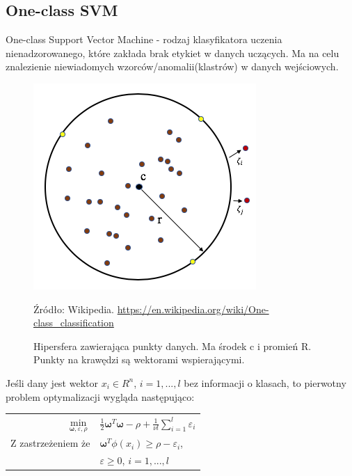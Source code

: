 \documentclass[paper=a4, fontsize=11pt]{scrartcl} %
\numberwithin{equation}{section} %
\numberwithin{figure}{section} %
\newcommand*{\captionsource}[2]{%
  \caption[{#1}]{%
      #1}
    Źródło: #2%
}
\begin{document}
\subsection{One-class SVM}
    \par One-class Support Vector Machine - rodzaj klasyfikatora uczenia
    nienadzorowanego, które zakłada brak etykiet w danych uczących. Ma na celu
    znalezienie niewiadomych wzorców/anomalii(klastrów) w danych wejściowych.  

    \begin{figure}[H]
        \begin{center}
            \includegraphics[scale=0.4]{./img/one-class-circle.png}
            \captionsource{Hipersfera zawierająca punkty danych. Ma środek c i promień R.
            Punkty na krawędzi są wektorami wspierającymi.}{Wikipedia. \url{https://en.wikipedia.org/wiki/One-class_classification}}
            \label{fig:one_class}
        \end{center}
    \end{figure}

    \par Jeśli dany jest wektor $x_i\in R^n$, $i=1,...,l$ bez informacji o klasach,
    to pierwotny problem optymalizacji wygląda następująco:

    \begin{center}
        \begin{tabular}{rl}
            $\min\limits_{\pmb{\omega},\varepsilon,\rho}$ & $\frac{1}{2}\pmb{\omega}^T\pmb{\omega} -
            \rho + \frac{1}{\nu l}\sum\limits_{i=1}^{l}\varepsilon_i$ \\
            Z zastrzeżeniem że & $\pmb{\omega}^T\phi(x_i)\geq\rho - \varepsilon_i$,\\
                               & $\varepsilon \geq 0$, $i=1,...,l$
        \end{tabular}
    \end{center}
\end{document}
